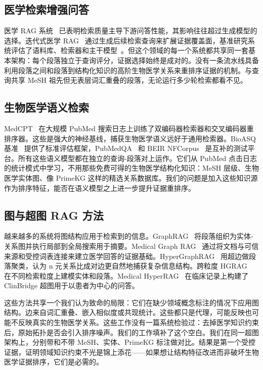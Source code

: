 \subsection{医学检索增强问答}

医学 RAG 系统~\citep{xiong2024benchmarking} 已表明检索质量主导下游问答性能，其影响往往超过生成模型的选择。迭代式医学 RAG~\citep{xiong2024imedrag} 通过生成后续检索查询来扩展证据覆盖面，基准研究系统评估了语料库、检索器和主干模型~\citep{xiong2024benchmarking}。但这个领域的每一个系统都共享同一套基本架构：每个段落独立于查询评分，证据选择始终是成对的。没有一条流水线具备利用段落之间和段落到结构化知识的高阶生物医学关系来重排序证据的机制。与查询共享 MeSH 祖先但无表层词汇重叠的段落，无论运行多少轮检索都看不见。

\subsection{生物医学语义检索}

MedCPT~\citep{jin2023medcpt} 在大规模 PubMed 搜索日志上训练了双编码器检索器和交叉编码器重排序器。这些是强大的神经基线，捕获生物医学语义远好于通用检索器。BioASQ 基准~\citep{tsatsaronis2015bioasq,krithara2023bioasqqa} 提供了标准评估框架，PubMedQA~\citep{jin2019pubmedqa} 和 BEIR NFCorpus~\citep{thakur2021beir} 是互补的测试平台。所有这些语义模型都在独立的查询-段落对上运作。它们从 PubMed 点击日志的统计模式中学习，不用那些免费可得的生物医学结构化知识：MeSH 层级、生物医学实体图、像 PrimeKG 这样的精选关系数据库。我们的问题是加入这些知识源作为排序特征，能否在语义模型之上进一步提升证据重排序。

\subsection{图与超图 RAG 方法}

越来越多的系统将图结构应用于检索到的信息。GraphRAG~\citep{edge2024graphrag} 将段落组织为实体-关系图并执行局部到全局搜索用于摘要。Medical Graph RAG~\citep{wu2024medgraphrag} 通过将文档与可信来源和受控词表连接来建立医学回答的证据基础。HyperGraphRAG~\citep{luo2025hypergraphrag} 用超边做段落聚类，认为 n 元关系比成对边更自然地捕获复杂信息结构。跨粒度 HGRAG~\citep{wang2026hgrag} 在不同检索粒度上建模实体和段落。Medical HyperRAG~\citep{xu2026medicalhyperrag} 在临床记录上构建了 ClinBridge 超图用于以患者为中心的问答。

这些方法共享一个我们认为致命的局限：它们在缺少领域概念标注的情况下应用图结构。边来自词汇重叠、嵌入相似度或共现统计。这些都只是代理，可能反映也可能不反映真实的生物医学关系。这些工作没有一篇系统检验过：去掉医学知识约束后，原始拓扑是否会引入排序噪声。我们的工作填补了这个空白。我们在同一超图架构上，分别带和不带 MeSH、实体、PrimeKG 标注做对比。结果是第一个受控证据，证明领域知识约束不光是锦上添花——如果想让结构特征改进而非破坏生物医学证据排序，它们是必需的。


